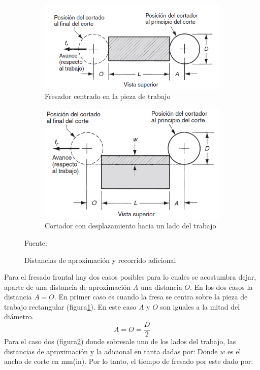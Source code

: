 \begin{figure}[hbt]
    \centering
    \begin{subfigure}{0.5\textwidth}
        \centering
        \includegraphics[width=0.9\linewidth]{Cap1_FormulaciondelProyecto/Figuras/fresadoFCP.PNG}
        \caption{Fresador centrado en la pieza de trabajo}
        \label{fig:fresadoFCP}
    \end{subfigure} 
    \begin{subfigure}{0.4\textwidth}
        \centering  
        \includegraphics[width=0.9\linewidth]{Cap1_FormulaciondelProyecto/Figuras/FresadodesplasaL.PNG}
        \caption{Cortador con desplazamiento hacia un lado del trabajo}
        \label{fig:FresadodesplasaL}
    \end{subfigure}
    
    \caption{Distancias de aproximación y recorrido adicional}{Fuente: \citep{groover2007fundamentals}}
    \label{fig:distanciasyrecoridoincial}
\end{figure}

Para el fresado frontal hay dos casos posibles para lo cuales se acostumbra dejar, aparte de una distancia de aproximación $A$ una distancia $O$. En los dos casos la distancia $A=O$. En primer caso es cuando la fresa se centra sobre la pieza de trabajo rectangular (figura\ref{fig:fresadoFCP}). En este caso $A$ y $O$ son iguales a la mitad del diámetro.
\begin{equation}
    A=O=\frac{D}{2}
\end{equation}
Para el caso dos (figura\ref{fig:FresadodesplasaL}) donde sobresale uno de los lados del trabajo, las distancias de aproximación y la adicional en tanta dadas por:
Donde $w$ es el ancho de corte en mm(in). Por lo tanto, el tiempo de fresado por este dado por:

